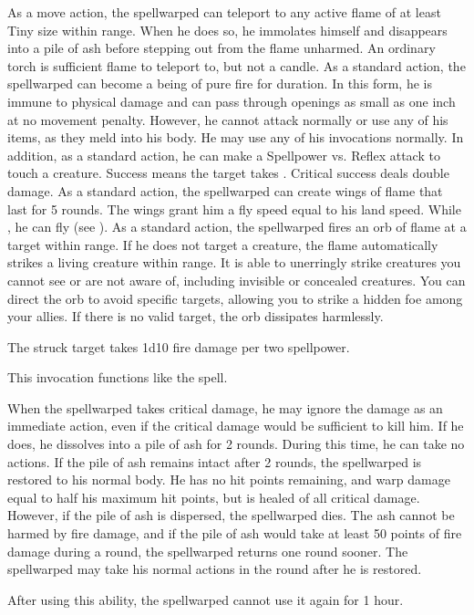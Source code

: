             As a move action, the spellwarped can teleport to any active flame of at least Tiny size within \rngmed range.
            When he does so, he immolates himself and disappears into a pile of ash before stepping out from the flame unharmed.
            An ordinary torch is sufficient flame to teleport to, but not a candle.
            As a standard action, the spellwarped can become a being of pure fire for \durshort duration.
            In this form, he is immune to physical damage and can pass through openings as small as one inch at no movement penalty.
            However, he cannot attack normally or use any of his items, as they meld into his body.
            He may use any of his invocations normally.
            In addition, as a standard action, he can make a Spellpower vs. Reflex attack to touch a creature.
            Success means the target takes .
            Critical success deals double damage.
            As a standard action, the spellwarped can create wings of flame that last for 5 rounds.
            The wings grant him a fly speed equal to his land speed.
            While \unencumbered, he can fly (see ).
            As a standard action, the spellwarped fires an orb of flame at a target within \rnglong range.
            If he does not target a creature, the flame automatically strikes a living creature within range.
            It is able to unerringly strike creatures you cannot see or are not aware of, including invisible or concealed creatures.
            You can direct the orb to avoid specific targets, allowing you to strike a hidden foe among your allies.
            If there is no valid target, the orb dissipates harmlessly.
            \par The struck target takes 1d10 fire damage per two spellpower.

            This invocation functions like the  spell.

            When the spellwarped takes critical damage, he may ignore the damage as an immediate action, even if the critical damage would be sufficient to kill him.
            If he does, he dissolves into a pile of ash for 2 rounds.
            During this time, he can take no actions.
            If the pile of ash remains intact after 2 rounds, the spellwarped is restored to his normal body.
            He has no hit points remaining, and warp damage equal to half his maximum hit points, but is healed of all critical damage.
            However, if the pile of ash is dispersed, the spellwarped dies.
            The ash cannot be harmed by fire damage, and if the pile of ash would take at least 50 points of fire damage during a round, the spellwarped returns one round sooner.
            The spellwarped may take his normal actions in the round after he is restored.
            \par After using this ability, the spellwarped cannot use it again for 1 hour.

